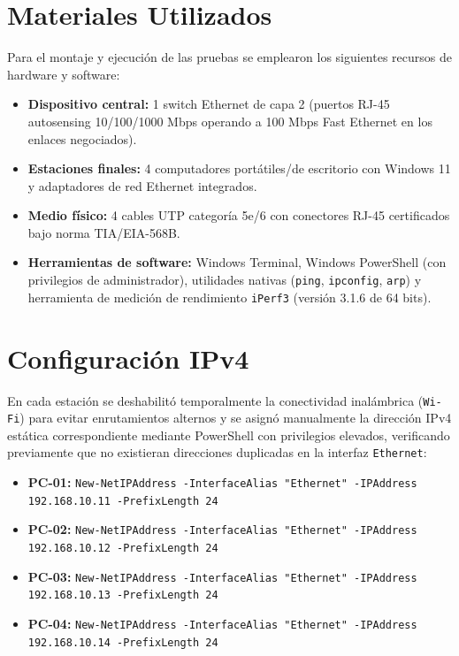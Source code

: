 \documentclass[11pt, a4paper]{article}
\begin{document}
\section{Materiales Utilizados}

Para el montaje y ejecución de las pruebas se emplearon los siguientes recursos de hardware y software:
\begin{itemize}
    \item \textbf{Dispositivo central:} 1 switch Ethernet de capa 2 (puertos RJ-45 autosensing 10/100/1000 Mbps operando a 100 Mbps Fast Ethernet en los enlaces negociados).
    \item \textbf{Estaciones finales:} 4 computadores portátiles/de escritorio con Windows 11 y adaptadores de red Ethernet integrados.
    \item \textbf{Medio físico:} 4 cables UTP categoría 5e/6 con conectores RJ-45 certificados bajo norma TIA/EIA-568B.
    \item \textbf{Herramientas de software:} Windows Terminal, Windows PowerShell (con privilegios de administrador), utilidades nativas (\texttt{ping}, \texttt{ipconfig}, \texttt{arp}) y herramienta de medición de rendimiento \texttt{iPerf3} (versión 3.1.6 de 64 bits).
\end{itemize}

\section{Configuración IPv4}

En cada estación se deshabilitó temporalmente la conectividad inalámbrica (\texttt{Wi-Fi}) para evitar enrutamientos alternos y se asignó manualmente la dirección IPv4 estática correspondiente mediante PowerShell con privilegios elevados, verificando previamente que no existieran direcciones duplicadas en la interfaz \texttt{Ethernet}:

\begin{itemize}
    \item \textbf{PC-01:} \small\texttt{New-NetIPAddress -InterfaceAlias "Ethernet" -IPAddress 192.168.10.11 -PrefixLength 24}
    \item \textbf{PC-02:} \small\texttt{New-NetIPAddress -InterfaceAlias "Ethernet" -IPAddress 192.168.10.12 -PrefixLength 24}
    \item \textbf{PC-03:} \small\texttt{New-NetIPAddress -InterfaceAlias "Ethernet" -IPAddress 192.168.10.13 -PrefixLength 24}
    \item \textbf{PC-04:} \small\texttt{New-NetIPAddress -InterfaceAlias "Ethernet" -IPAddress 192.168.10.14 -PrefixLength 24}
\end{itemize}
\end{document}
